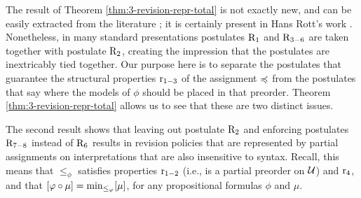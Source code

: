 
The result of Theorem \ref{thm:3-revision-repr-total} is not exactly new, 
and can be easily extracted from the literature \cite{KatsunoM92};
it is certainly present in Hans Rott's work \cite{Rott01}.
Nonetheless, in many standard presentations 
postulates $\mathrm{R}_{1}$ and $\mathrm{R}_{3-6}$ are taken together 
with postulate $\mathrm{R}_{2}$, creating the impression that the postulates
are inextricably tied together. 
Our purpose here is to separate the postulates
that guarantee the structural properties $\mathrm{r}_{1-3}$ 
of the assignment $\preccurlyeq$ 	
from the postulates that say where the 
models of $\phi$ should be placed in that preorder.
Theorem \ref{thm:3-revision-repr-total} 
allows us to see that these are two distinct issues.

The second result shows that leaving out postulate $\mathrm{R}_{2}$ 
and enforcing postulates $\mathrm{R}_{7-8}$ instead of $\mathrm{R}_{6}$
results in revision policies that are represented by partial assignments on interpretations
that are also insensitive to syntax.
Recall, this means that $\le_\phi$ satisfies properties 
$\mathrm{r}_{1-2}$ (i.e., is a partial preorder on $\mathcal{U}$)
and $\mathrm{r}_{4}$, and that
$[\varphi\circ\mu]={\operatorname{min}}_{\le_\varphi}[\mu]$,
for any propositional formulas $\phi$ and $\mu$.

